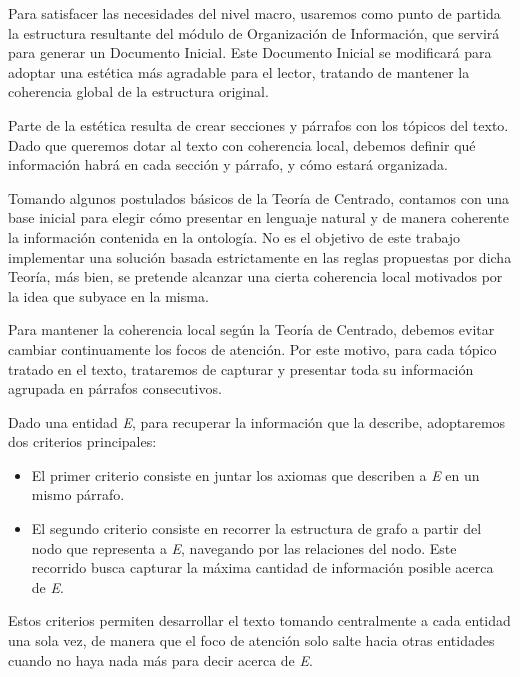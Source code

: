 Para satisfacer las necesidades del nivel macro, usaremos como punto de partida la estructura resultante del módulo de Organización de Información, que servirá para generar un Documento Inicial. Este Documento Inicial se modificará para adoptar una estética más agradable para el lector, tratando de mantener la coherencia global de la estructura original.

Parte de la estética resulta de crear secciones y párrafos con los tópicos del texto. Dado que queremos dotar al texto con coherencia local, debemos definir qué información habrá en cada sección y párrafo, y cómo estará organizada. 

Tomando algunos postulados básicos de la Teoría de Centrado, contamos con una base inicial para elegir cómo presentar en lenguaje natural y de manera coherente la información contenida en la ontología. No es el objetivo de este trabajo implementar una solución basada estrictamente en las reglas propuestas por dicha Teoría, más bien, se pretende alcanzar una cierta coherencia local motivados por la idea que subyace en la misma.

Para mantener la coherencia local según la Teoría de Centrado, debemos evitar cambiar continuamente los focos de atención. Por este motivo, para cada tópico tratado en el texto, trataremos de capturar y presentar toda su información agrupada en párrafos consecutivos.  

Dado una entidad \emph{E}, para recuperar la información que la describe, adoptaremos dos criterios principales:
\begin{itemize}
    \item El primer criterio consiste en juntar los axiomas que describen a \emph{E} en un mismo párrafo. %
    \item El segundo criterio consiste en recorrer la estructura de grafo a partir del nodo que representa a \emph{E}, navegando por las relaciones del nodo. Este recorrido busca capturar la máxima cantidad de información posible acerca de \emph{E}. 
\end{itemize}

Estos criterios permiten desarrollar el texto tomando centralmente a cada entidad una sola vez, de manera que el foco de atención solo salte hacia otras entidades cuando no haya nada más para decir acerca de \emph{E}.


